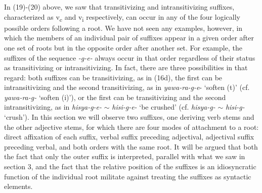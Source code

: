 \documentclass[output=paper,
modfonts
]{LSP/langsci}
\begin{document}
In (19)-(20) above, we saw that transitivizing and intransitivizing
suffixes, characterized as v\textsubscript{c} and v\textsubscript{i}
respectively, can occur in any of the four logically possible orders
following a root. We have not seen any examples, however, in which the
members of an individual pair of suffixes appear in a given order after
one set of roots but in the opposite order after another set. For
example, the suffixes of the sequence \textit{-g-e-} always occur in that
order regardless of their status as transitivizing or intransitivizing.
In fact, there are three possibilities in that regard: both suffixes can
be transitivizing, as in (16d), the first can be intransitivizing and
the second transitivizing, as in \textit{yawa-ra-g-e}- `soften (t)' (cf.
\textit{yawa-ra-g-} `soften (i)'), or the first can be transitivizing and
the second intransitivizing, as in \textit{hisya-g-e-} $\sim$ \textit{hisi-g-e-}
`be crushed' (cf. \textit{hisya-g-} $\sim$ \textit{hisi-g-} `crush'). In this
section we will observe two suffixes, one deriving verb stems and the
other adjective stems, for which there are four modes of attachment to a
root: direct affixation of each suffix, verbal suffix preceding
adjectival, adjectival suffix preceding verbal, and both orders with the
same root. It will be argued that both the fact that only the outer
suffix is interpreted, parallel with what we saw in section 3, and the
fact that the relative position of the suffixes is an idiosyncratic
function of the individual root militate against treating the suffixes
as syntactic elements.
\end{document}
